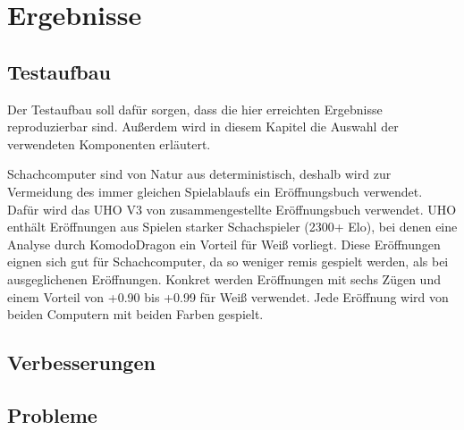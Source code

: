 \chapter{Ergebnisse}
\label{chap:Ergebnisse}

\section{Testaufbau}

Der Testaufbau soll dafür sorgen, dass die hier erreichten Ergebnisse reproduzierbar sind. Außerdem wird in diesem Kapitel die Auswahl der verwendeten Komponenten erläutert.

Schachcomputer sind von Natur aus deterministisch, deshalb wird zur Vermeidung des immer gleichen Spielablaufs ein Eröffnungsbuch verwendet. Dafür wird das \ac{UHO} V3 von \citeauthor{Pohl2021} \cite{Pohl2021} zusammengestellte Eröffnungsbuch verwendet. \ac{UHO} enthält Eröffnungen aus Spielen starker Schachspieler (2300+ Elo), bei denen eine Analyse durch KomodoDragon \cite{KomodoDragon} ein Vorteil für Weiß vorliegt. Diese Eröffnungen eignen sich gut für Schachcomputer, da so weniger remis gespielt werden, als bei ausgeglichenen Eröffnungen. Konkret werden Eröffnungen mit sechs Zügen und einem Vorteil von +0.90 bis +0.99 für Weiß verwendet. Jede Eröffnung wird von beiden Computern mit beiden Farben gespielt.

\section{Verbesserungen}


\section{Probleme}

